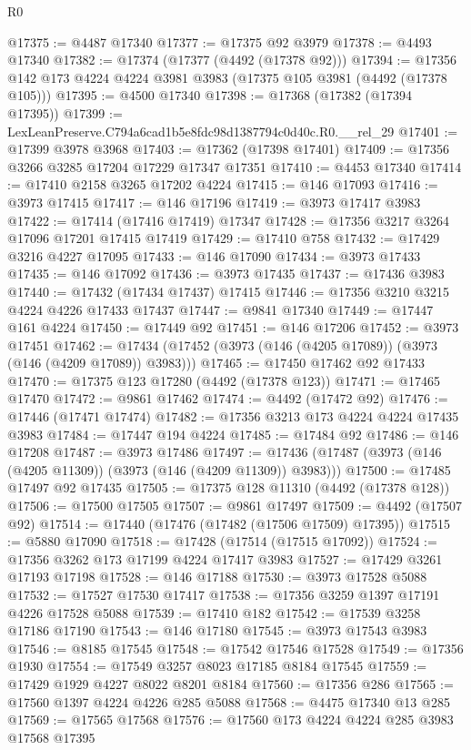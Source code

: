 \begin{lexlean}{R0}
\begin{coremodule}
@17375 := @4487 @17340
@17377 := @17375 @92 @3979
@17378 := @4493 @17340
@17382 := @17374 (@17377 (@4492 (@17378 @92)))
@17394 := @17356 @142 @173 @4224 @4224 @3981 @3983 (@17375 @105 @3981 (@4492 (@17378 @105)))
@17395 := @4500 @17340
@17398 := @17368 (@17382 (@17394 @17395))
@17399 := LexLeanPreserve.C794a6cad1b5e8fdc98d1387794c0d40c.R0.__rel_29
@17401 := @17399 @3978 @3968
@17403 := @17362 (@17398 @17401)
@17409 := @17356 @3266 @3285 @17204 @17229 @17347 @17351
@17410 := @4453 @17340
@17414 := @17410 @2158 @3265 @17202 @4224
@17415 := @146 @17093
@17416 := @3973 @17415
@17417 := @146 @17196
@17419 := @3973 @17417 @3983
@17422 := @17414 (@17416 @17419) @17347
@17428 := @17356 @3217 @3264 @17096 @17201 @17415 @17419
@17429 := @17410 @758
@17432 := @17429 @3216 @4227 @17095
@17433 := @146 @17090
@17434 := @3973 @17433
@17435 := @146 @17092
@17436 := @3973 @17435
@17437 := @17436 @3983
@17440 := @17432 (@17434 @17437) @17415
@17446 := @17356 @3210 @3215 @4224 @4226 @17433 @17437
@17447 := @9841 @17340
@17449 := @17447 @161 @4224
@17450 := @17449 @92
@17451 := @146 @17206
@17452 := @3973 @17451
@17462 := @17434 (@17452 (@3973 (@146 (@4205 @17089)) (@3973 (@146 (@4209 @17089)) @3983)))
@17465 := @17450 @17462 @92 @17433
@17470 := @17375 @123 @17280 (@4492 (@17378 @123))
@17471 := @17465 @17470
@17472 := @9861 @17462
@17474 := @4492 (@17472 @92)
@17476 := @17446 (@17471 @17474)
@17482 := @17356 @3213 @173 @4224 @4224 @17435 @3983
@17484 := @17447 @194 @4224
@17485 := @17484 @92
@17486 := @146 @17208
@17487 := @3973 @17486
@17497 := @17436 (@17487 (@3973 (@146 (@4205 @11309)) (@3973 (@146 (@4209 @11309)) @3983)))
@17500 := @17485 @17497 @92 @17435
@17505 := @17375 @128 @11310 (@4492 (@17378 @128))
@17506 := @17500 @17505
@17507 := @9861 @17497
@17509 := @4492 (@17507 @92)
@17514 := @17440 (@17476 (@17482 (@17506 @17509) @17395))
@17515 := @5880 @17090
@17518 := @17428 (@17514 (@17515 @17092))
@17524 := @17356 @3262 @173 @17199 @4224 @17417 @3983
@17527 := @17429 @3261 @17193 @17198
@17528 := @146 @17188
@17530 := @3973 @17528 @5088
@17532 := @17527 @17530 @17417
@17538 := @17356 @3259 @1397 @17191 @4226 @17528 @5088
@17539 := @17410 @182
@17542 := @17539 @3258 @17186 @17190
@17543 := @146 @17180
@17545 := @3973 @17543 @3983
@17546 := @8185 @17545
@17548 := @17542 @17546 @17528
@17549 := @17356 @1930
@17554 := @17549 @3257 @8023 @17185 @8184 @17545
@17559 := @17429 @1929 @4227 @8022 @8201 @8184
@17560 := @17356 @286
@17565 := @17560 @1397 @4224 @4226 @285 @5088
@17568 := @4475 @17340 @13 @285
@17569 := @17565 @17568
@17576 := @17560 @173 @4224 @4224 @285 @3983 @17568 @17395

\end{coremodule}
\end{lexlean}
